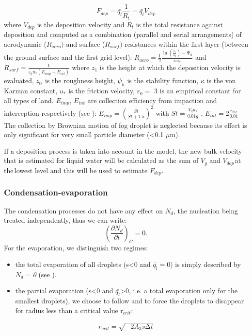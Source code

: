 \begin{equation}
F_{dep}=\bar{q_{l}}\frac{1}{R_{t}}=\bar{q_{l}}V_{dep}
\end{equation}
where $V_{dep}$ is the deposition velocity and $R_{t}$ is the total resistance
against deposition and computed as a combination (parallel and serial
arrangements) of aerodynamic ($R_{aero})$ and surface ($R_{surf})$ resistances
within the first layer (between the ground surface and the first grid level):
\newline
$R_{aero}=\frac{1}{2}\frac{\ln \left( \frac{z_{1}}{z_{0}}
\right)-\mathrm{\Psi }_{h}}{\kappa u_{\ast }}$ and
$R_{surf}=\frac{1}{\varepsilon_{0}u_{\ast }\left( E_{imp}+E_{int} \right)}$
\newline
where $z_{1}$ is the height at which the deposition velocity is evaluated,
$z_{0\, }$ is the roughness height, $\psi_{h}$ is the stability function,
$\kappa $ is the von Karman constant, $u_{\ast }$ is the friction velocity,
$\varepsilon_{0}=$ 3 is an empirical constant for all types of land.
$E_{imp}$, $E_{int}$ are collection efficiency from impaction and interception
respectively (see \cite{Zhang:2001} ):
\newline
\newline
$E_{imp}=\left( \frac{St}{St+1.5} \right)^{2}$ with $St=\frac{V_{g}u_{\ast
}}{0.01g}$ , $E_{int}=2\frac{r_{mv}}{0.01}$
\newline
\newline
The collection by Brownian motion of fog droplet is neglected because its
effect is only significant for very small particle diameter (\textless 0.1
$\mu$m).

If a deposition process is taken into account in the model, the new bulk
velocity that is estimated for liquid water will be calculated as the sum of
$V_{g}$ and $V_{dep\, }$at the$_{\, }$lowest level and this will be used to
estimate $F_{dep}$.

\subsubsection{Condensation-evaporation}
The condensation processes do not have any effect on $N_{d}$, the nucleation
being treated independently, thus we can write:
\begin{equation}
\left( \frac{\partial N_{d}}{\partial t} \right)_{C}=0.
\end{equation}
For the evaporation, we distinguish two regimes:
\begin{itemize}
\item the total evaporation of all droplets (s\textless 0 and
 $\bar{q_{l}}=$0) is simply described by $N_{d}=$\textit{0} (see \cite{Cohard:2000}).
\item the partial evaporation (s\textless 0 and
 $\bar{q_{l}}$\textgreater 0, i.e. a total evaporation only for the
 smallest droplets), we choose to follow \cite{Chaumerliac:1987} and to force
 the droplets to disappear for radius less than a critical value r$_{crit}$:
\end{itemize}
\begin{equation}
r_{crit}=\sqrt {-2A_{3}s\mathrm{\Delta }t}
\end{equation}

